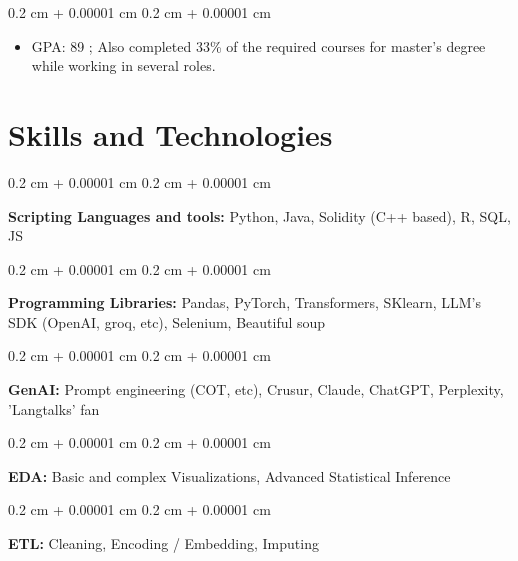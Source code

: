 \documentclass[10pt, letterpaper]{article}
\newenvironment{highlights}{
    \begin{itemize}[
        topsep=0.10 cm,
        parsep=0.8 cm,
        partopsep=0pt,
        itemsep=0pt,
        leftmargin=0.4 cm + 10pt
    ]
}{
    \end{itemize}
} %
\newenvironment{onecolentry}{
    \begin{adjustwidth}{
        0.2 cm + 0.00001 cm
    }{
        0.2 cm + 0.00001 cm
    }
}{
    \end{adjustwidth}
} %
\begin{document}
        \vspace{0.10 cm}
        \begin{onecolentry}
            \begin{highlights}
                \item GPA: 89 ; Also completed 33\% of the required courses for master's degree while working in several roles.
            \end{highlights}
        \end{onecolentry}



    
    \section{Skills and Technologies}



        
        \begin{onecolentry}
            \textbf{Scripting Languages and tools:} Python, Java, Solidity (C++ based), R, SQL, JS
        \end{onecolentry}

        \vspace{0.2 cm}

        \begin{onecolentry}
            \textbf{Programming Libraries:} Pandas, PyTorch, Transformers, SKlearn, LLM's SDK (OpenAI, groq, etc), Selenium, Beautiful soup
        \end{onecolentry}

        \vspace{0.2 cm}

        \begin{onecolentry}
            \textbf{GenAI:} Prompt engineering (COT, etc), Crusur, Claude, ChatGPT, Perplexity, 'Langtalks' fan
        \end{onecolentry}

        \vspace{0.2 cm}

        \begin{onecolentry}
            \textbf{EDA:} Basic and complex Visualizations, Advanced Statistical Inference
        \end{onecolentry}

        \vspace{0.2 cm}

        \begin{onecolentry}
            \textbf{ETL:} Cleaning, Encoding / Embedding, Imputing
        \end{onecolentry}
\end{document}
